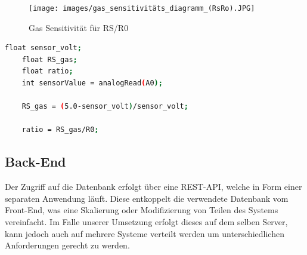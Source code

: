 \documentclass{article}
\begin{document}
\begin{figure}[h]
 \centering
 \texttt{[image: images/gas\_sensitivitäts\_diagramm\_(RsRo).JPG]}
 \caption{Gas Sensitivität für RS/R0}
 \label{fig:gas_sensitivität}
\end{figure}

\begin{lstlisting}[language=Bash, caption=Messung des CO Sensors, label=list:co-sensor-gas]
    float sensor_volt;
    float RS_gas; 
    float ratio; 
    int sensorValue = analogRead(A0);

    RS_gas = (5.0-sensor_volt)/sensor_volt; 

    ratio = RS_gas/R0;
\end{lstlisting}




\subsection{Back-End}
Der Zugriff auf die Datenbank erfolgt über eine REST-API, welche in Form einer separaten Anwendung läuft.
Diese entkoppelt die verwendete Datenbank vom Front-End, was eine Skalierung oder Modifizierung von Teilen des Systems vereinfacht.
Im Falle unserer Umsetzung erfolgt dieses auf dem selben Server, kann jedoch auch auf mehrere Systeme verteilt werden um unterschiedlichen Anforderungen gerecht zu werden.
\end{document}
